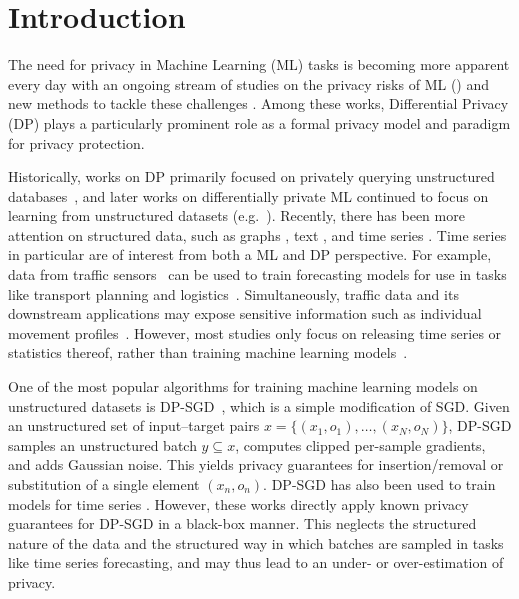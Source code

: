 \section{Introduction}


The need for privacy in Machine Learning (ML) tasks is becoming more apparent every day with an ongoing stream of studies on the privacy risks of ML (\cite{rigaki2023survey}) and new methods to tackle these challenges \cite{liu2021machine, pan2024differential, el2022differential}. 
Among these works, Differential Privacy (DP) \cite{dwork2006differential} plays a particularly prominent role as a formal privacy model
and paradigm for privacy protection.

Historically, works on DP primarily focused on privately querying unstructured databases~\cite{dwork2010differential},
and later works on differentially private ML continued to focus on learning from unstructured datasets (e.g.~\cite{abadi2016deep}).
Recently, there has been more attention on structured data, such as graphs \cite{mueller2022sok, olatunji2021releasing}, text \cite{yue2022synthetic, charles2024fine, chua2024mind}, and time series \cite{mao2024differential}.
Time series in particular are of interest from both a ML and DP perspective.
For example, data from traffic sensors~\cite{chen2001freeway} can be used to train forecasting models for use in tasks like transport planning and logistics~\cite{lana2018road}.
Simultaneously, traffic data and its downstream applications may expose sensitive information such as individual movement profiles~\cite{giannotti2008mobility}.
However, most studies only focus on releasing time series or statistics thereof, rather than training machine learning models~\cite{shi2011privacy,fan2014adaptive, wang2016rescuedp, wang2020towards, zhang2017dpoctor, fioretto2019optstream, kellaris2014differentially, mao2024differential,katsomallos2019privacy}.%

One of the most popular algorithms for training machine learning models on unstructured datasets is DP-SGD~\cite{song2013stochastic,abadi2016deep}, which is a simple modification of SGD.
Given an unstructured set of input--target pairs $x = \{(x_1,o_1), \dots, (x_N, o_N)\}$,
DP-SGD samples an unstructured batch $y \subseteq x$,
computes clipped per-sample gradients, and adds Gaussian noise. 
This yields privacy guarantees for insertion/removal or substitution of a single element $(x_n, o_n)$.
DP-SGD has also been used to train models for time series  \cite{mercier2021evaluating,imtiaz2020privacy, arcolezi2022differentially}.
However, these works directly apply known privacy guarantees for DP-SGD in a black-box manner.
This neglects the structured nature of the data and the structured way in which batches are sampled in tasks like time series forecasting, and may thus lead to an under- or over-estimation of privacy.


